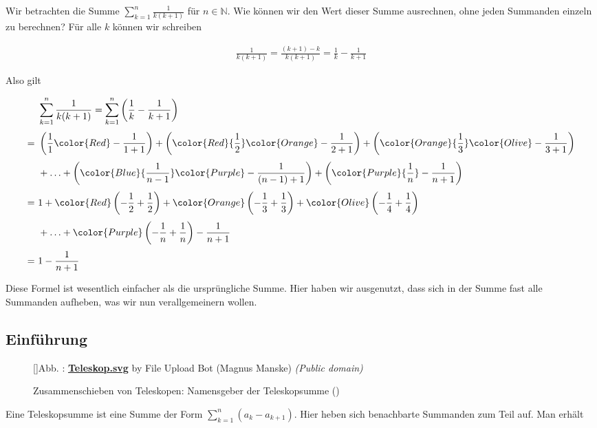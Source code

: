 \documentclass[fontsize=9pt,
               parskip=half-,
               DIV=14,
               listof=chapterentry,
               tocflat]{scrbook}
\newcounter{imagelabel}
\begin{document}
Wir betrachten die Summe $\sum _{k=1}^{n}{\frac {1}{k(k+1)}}$ für $n\in \mathbb {N} $. Wie können wir den Wert dieser Summe ausrechnen, ohne jeden Summanden einzeln zu berechnen? Für alle $k$ können wir schreiben

\begin{align*}
{\frac {1}{k(k+1)}}={\frac {(k+1)-k}{k(k+1)}}={\frac {1}{k}}-{\frac {1}{k+1}}
\end{align*}

Also gilt

\begin{align*}
&\sum _{k=1}^{n}{\frac {1}{k(k+1)}}=\sum _{k=1}^{n}\left({\frac {1}{k}}-{\frac {1}{k+1}}\right)\\[0.3em]=\ &\left({\frac {1}{1}}{\color {Red}-{\frac {1}{1+1}}}\right)+\left({\color {Red}{\frac {1}{2}}}{\color {Orange}-{\frac {1}{2+1}}}\right)+\left({\color {Orange}{\frac {1}{3}}}{\color {Olive}-{\frac {1}{3+1}}}\right)\\[0.3em]&+\ldots +\left({\color {Blue}{\frac {1}{n-1}}}{\color {Purple}-{\frac {1}{(n-1)+1}}}\right)+\left({\color {Purple}{\frac {1}{n}}}-{\frac {1}{n+1}}\right)\\[0.3em]=\ &1+{\color {Red}\left(-{\frac {1}{2}}+{\frac {1}{2}}\right)}+{\color {Orange}\left(-{\frac {1}{3}}+{\frac {1}{3}}\right)}+{\color {Olive}\left(-{\frac {1}{4}}+{\frac {1}{4}}\right)}\\[0.3em]&+\ldots +{\color {Purple}\left(-{\frac {1}{n}}+{\frac {1}{n}}\right)}-{\frac {1}{n+1}}\\[0.3em]=\ &1-{\frac {1}{n+1}}
\end{align*}

Diese Formel ist wesentlich einfacher als die ursprüngliche Summe. Hier haben wir ausgenutzt, dass sich in der Summe fast alle Summanden aufheben, was wir nun verallgemeinern wollen.

\subsection{Einführung}

\begin{figure}[h]
\vspace{\baselineskip}
[]{Abb. : \protect\href{https://commons.wikimedia.org/wiki/File:Teleskop.svg}{\textbf{Teleskop.svg}} by File Upload Bot (Magnus Manske) \textit{(Public domain)}}\centering
{}
\caption*{Zusammenschieben von Teleskopen: Namensgeber der Teleskopsumme ()}
\end{figure}
Eine Teleskopsumme ist eine Summe der Form $\sum _{k=1}^{n}(a_{k}-a_{k+1})$. Hier heben sich benachbarte Summanden zum Teil auf. Man erhält
\end{document}
